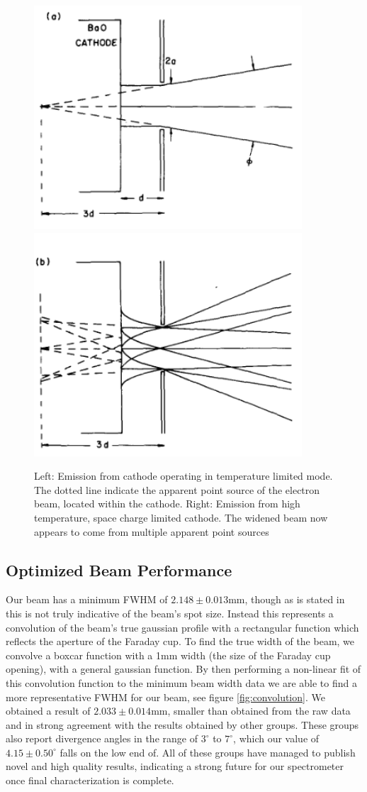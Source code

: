\begin{figure}[h!]
    \centering
    \includegraphics[width=0.45\linewidth]{../Assets/Low Temp.png}
    \includegraphics[width=0.45\linewidth]{../Assets/High Temp.png}
    \caption{Left: Emission from cathode operating in temperature limited mode. The dotted line indicate the apparent point source of the electron 
    beam, located within the cathode. Right: Emission from high temperature, space charge limited cathode. The widened beam now appears to come 
    from multiple apparent point sources\cite{stoffel1985low}}
    \label{fig:cath}
\end{figure}

\subsection{Optimized Beam Performance}

Our beam has a minimum FWHM of $2.148\pm0.013$mm, though as is stated in \cite{raj2004optimization} this is not truly indicative of the beam's spot size. 
Instead this represents a convolution of the beam's true gaussian profile with a rectangular function which reflects the aperture of the Faraday cup.
To find the true width of the beam, we convolve a boxcar function with a 1mm width (the size of the Faraday cup opening), with a general gaussian function. 
By then performing a non-linear fit of this convolution function to the minimum beam width data we are able to find a more representative FWHM for 
our beam, see figure \ref{fig:convolution}. We obtained a result of $2.033\pm0.014$mm, smaller than obtained from the raw data and in strong agreement with the results obtained by other 
groups\cite{raj2004optimization,ipes,Ciccacci}. These groups also report divergence angles in the range of $3^\circ$ to $7^\circ$, which our value 
of $4.15\pm0.50^\circ$ falls on the low end of. All of these groups have managed to publish novel and high quality results, indicating a strong 
future for our spectrometer once final characterization is complete.

